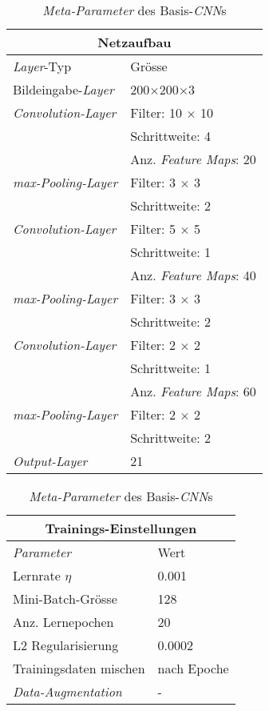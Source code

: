 \begin{table}[!htb]
	\def\arraystretch{1.4}
	\centering
	\begin{subtable}[t]{.5\linewidth}
		\begin{tabular}[t]{l | l }
			\multicolumn{2}{c}{\textbf{Netzaufbau}}\\
			\hline
			\textit{Layer}-Typ & Grösse\\
			\hline
			\hline
			Bildeingabe-\textit{Layer} & 200$\times$200$\times$3\\
			\hline
			\textit{Convolution-Layer}& Filter: 10 $\times$ 10\\
									  & Schrittweite: 4\\
									  & Anz. \textit{Feature Maps}: 20\\
			\hline
			\textit{max-Pooling-Layer}& Filter: 3 $\times$ 3\\
									  & Schrittweite: 2\\
			
			\hline
			\textit{Convolution-Layer}& Filter: 5 $\times$ 5\\
									  & Schrittweite: 1\\
									  & Anz. \textit{Feature Maps}: 40\\
			\hline
			\textit{max-Pooling-Layer}& Filter: 3 $\times$ 3\\
									  & Schrittweite: 2\\
			\hline
			\textit{Convolution-Layer}& Filter: 2 $\times$ 2\\
									  & Schrittweite: 1\\
									  & Anz. \textit{Feature Maps}: 60\\
			\hline
			\textit{max-Pooling-Layer}& Filter: 2 $\times$ 2\\
									  & Schrittweite: 2\\
			\hline
			\textit{Output-Layer}   & 21\\
		\end{tabular}
	\end{subtable}%
	\begin{subtable}[t]{.5\linewidth}
		\begin{tabular}[t]{l | l }
			\multicolumn{2}{c}{\textbf{Trainings-Einstellungen}}\\
			\hline
			\textit{Parameter} & Wert\\
			\hline
			\hline
			Lernrate $\eta$ & 0.001\\
			Mini-Batch-Grösse & 128\\
			Anz. Lernepochen & 20\\
			L2 Regularisierung & 0.0002\\
			Trainingsdaten mischen& nach Epoche\\
			\textit{Data-Augmentation}& - \\
		\end{tabular}
	\end{subtable} 
	\caption{\textit{Meta-Parameter} des Basis-\textit{CNN}s}
	\label{table:basic_cnn_training}
\end{table}


